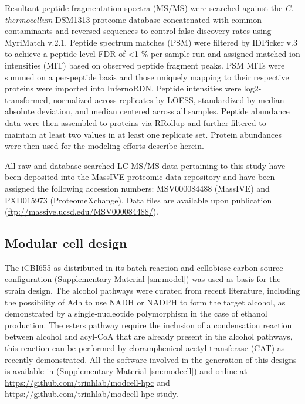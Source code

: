 Resultant peptide fragmentation spectra (MS/MS) were searched against the \textit{C. thermocellum} DSM1313 proteome database concatenated with common contaminants and reversed sequences to control false-discovery rates using MyriMatch v.2.1.\citep{tabb2007}
Peptide spectrum matches (PSM) were filtered by IDPicker v.3\citep{ma2009} to achieve a peptide-level FDR of \textless1 \% per sample run and assigned matched-ion intensities (MIT) based on observed peptide fragment peaks.
PSM MITs were summed on a per-peptide basis and those uniquely mapping to their respective proteins were imported into InfernoRDN.\citep{taverner2012}
Peptide intensities were log2-transformed, normalized across replicates by LOESS, standardized by median absolute deviation, and median centered across all samples. Peptide abundance data were then assembled to proteins via RRollup and further filtered to maintain at least two values in at least one replicate set. Protein abundances were then used for the modeling efforts describe herein.

All raw and database-searched LC-MS/MS data pertaining to this study have been deposited into the MassIVE proteomic data repository and have been assigned the following accession numbers: MSV000084488 (MassIVE) and PXD015973 (ProteomeXchange). Data files are available upon publication (\url{ftp://massive.ucsd.edu/MSV000084488/}).

\subsection{Modular cell design}
The iCBI655 as distributed in its batch reaction and cellobiose carbon source configuration (Supplementary Material \ref{sm:model}) was used as basis for the strain design.
The alcohol pathways were curated from recent literature, \citep{holwerda2014, lin2015} including the possibility of Adh to use NADH or NADPH to form the target alcohol, as demonstrated by a single-nucleotide polymorphism in the case of ethanol production. \citep{biswas2015}
The esters pathway require the inclusion of a condensation reaction between alcohol and acyl-CoA that are already present in the alcohol pathways, this reaction can be performed by cloramphenicol acetyl transferase (CAT)  as recently demonstrated.\citep{seo2019}
All the software involved in the generation of this designs is available in (Supplementary Material \ref{sm:modcell}) and online at \url{https://github.com/trinhlab/modcell-hpc} and \url{https://github.com/trinhlab/modcell-hpc-study}.


